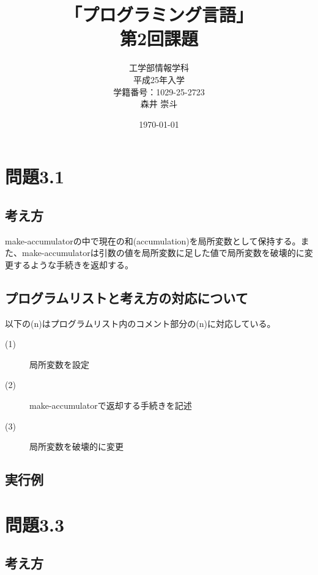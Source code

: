 \documentclass[a4paper,12pt]{article}
\begin{document}
\title{「プログラミング言語」\\
第2回課題}
\author{工学部情報学科\\
平成25年入学\\
学籍番号：1029-25-2723\\
森井 崇斗 }
\date{\today}
\maketitle

\lstset{numbers=left,basicstyle=\ttfamily\small,
  commentstyle=\textit, keywordstyle=\bfseries}

\section{問題3.1}

\subsection{考え方}

make-accumulatorの中で現在の和(accumulation)を局所変数として保持する。また、make-accumulatorは引数の値を局所変数に足した値で局所変数を破壊的に変更するような手続きを返却する。

\subsection{プログラムリストと考え方の対応について}



以下の(n)はプログラムリスト内のコメント部分の(n)に対応している。

\begin{description}
    \item[(1)]局所変数を設定
    \item[(2)]make-accumulatorで返却する手続きを記述
    \item[(3)]局所変数を破壊的に変更
\end{description}

\subsection{実行例}


\section{問題3.3}

\subsection{考え方}
\end{document}
